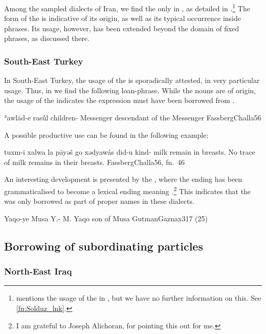Among the sampled dialects of Iran, we find the \ez* only in \JSan, as detailed in .\footnote{\citet[171, \S 2.32.12]{Garbell1965impact} mentions the usage of the \Sor \ez* {} in \Sol, but we have no further information on this. See \vref{fn:Solduz_lnk}.} The form of the \ez* {} is indicative of its \Per origin, as well as its typical occurrence inside \Per phrases. Its usage, however, has been extended beyond the domain of fixed \Per phrases, as discussed there.

\subsubsection{South-East Turkey}

In South-East Turkey, the usage of the \ez* is sporadically attested, in very particular usage. Thus, in \Cal we find the following loan-phrase. While the nouns are of  origin, the usage of the \ez* indicates the expression must have been borrowed from \Kur.

{ʾawlād-e rasū́l}
{children-\ez{} Messenger}
{descendant of the Messenger}
{FassbergChalla}{56}

A possible productive use can be found in the following example:

{tuxm-i xalwa la pāyəš go xədyawás did-u}
{kind-\ez{} milk \neg{} remain in breasts.\cst{} \pl}
{No trace of milk remains in their breasts.}
{FassbergChalla}{56, fn.\ 46}

An interesting development is presented by the , where the \ez* ending has been grammaticalised to become a lexical ending meaning .\footnote{I am grateful to Joseph Alichoran, for pointing this out for me.} This indicates that the \ez* was only borrowed as part of proper names in these dialects.

{Yaqo-ye Musa}
{Y.-\ez{} M.}
{Yaqo son of Musa}
{GutmanGaznax}{317 (25)}


\subsection{Borrowing of subordinating particles} \label{ss:borrow_ke}

\subsubsection{North-East Iraq}


